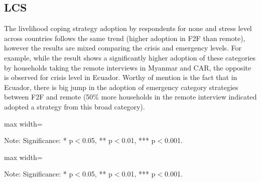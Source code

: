 \documentclass[11pt,harvard]{article}
\begin{document}
	\pagebreak
	
	\subsection{LCS}
	
	The livelihood coping strategy adoption by respondents for none and stress level across countries follows the same trend (higher adoption in F2F than remote), however the results are mixed comparing the crisis and emergency levels. For example, while the result shows a significantly higher adoption of these categories by households taking the remote interviews in Myanmar and CAR, the opposite is observed for crisis level in Ecuador. Worthy of mention is the fact that in Ecuador, there is big jump in the adoption of emergency category strategies between F2F and remote (50\% more households in the remote interview indicated adopted a strategy from this broad category). 
	
	\begin{table}[htbp]
		\centering
		\begin{adjustbox}{max width=\textwidth}
			\begin{threeparttable}
				\caption{Impact of Survey Modality on Livelihood Coping Strategy Index}
				\scriptsize
				 
				\label{tab:LCS_Modality_All_Country}
				\begin{tablenotes}
					\item Note: Significance: * p$<$0.05, ** p$<$0.01, *** p$<$0.001. 
				\end{tablenotes}
			\end{threeparttable}
		\end{adjustbox}
	\end{table}
	
	\begin{table}[htbp]
		\centering
		\begin{adjustbox}{max width=\textwidth}
			\begin{threeparttable}
				\caption{Myanmar: Each Coping Strategy Used}
				\scriptsize
				 
				\label{tab:LCS_Ind_Modality_Myanmar}
				\begin{tablenotes}
					\item Note: Significance: * p$<$0.05, ** p$<$0.01, *** p$<$0.001. 
				\end{tablenotes}
			\end{threeparttable}
		\end{adjustbox}
	\end{table}
	
\end{document}
